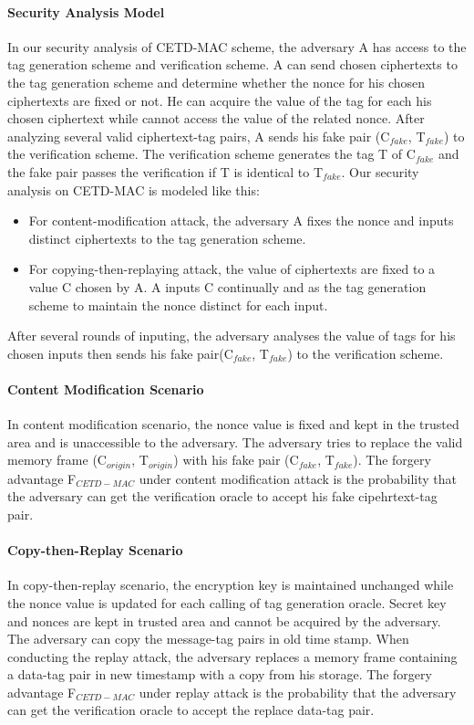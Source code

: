 \documentclass{article}
\begin{document}
\paragraph{Security Analysis Model}%
In our security analysis of CETD-MAC scheme, the adversary A has access to the tag generation scheme and verification scheme. A can send chosen ciphertexts to the tag generation scheme and determine whether the nonce for his chosen ciphertexts are fixed or not. He can acquire the value of the tag for each his chosen ciphertext while cannot access the value of the related nonce. After analyzing several valid ciphertext-tag pairs, A sends his fake pair (C$_{fake}$, T$_{fake}$) to the verification scheme. The verification scheme generates the tag T of C$_{fake}$ and the fake pair passes the verification if T is identical to T$_{fake}$. Our security analysis on CETD-MAC is modeled like this:
\begin{itemize}
	\item For content-modification attack, the adversary A fixes the nonce and inputs distinct ciphertexts to the tag generation scheme. 	
	\item For copying-then-replaying attack, the value of ciphertexts are fixed to a value C chosen by A. A inputs C continually and as the tag generation scheme to maintain the nonce distinct for each input.    
\end{itemize}
After several rounds of inputing, the adversary analyses the value of tags for his chosen inputs then sends his fake pair(C$_{fake}$, T$_{fake}$) to the verification scheme.   	

\paragraph{Content Modification Scenario}
In content modification scenario, the nonce value is fixed and kept in the trusted area and is unaccessible to the adversary. The adversary tries to replace the valid memory frame (C$_{origin}$, T$_{origin}$) with his fake pair (C$_{fake}$, T$_{fake}$). The forgery advantage F$_{CETD-MAC}$ under content modification attack is the probability that the adversary can get the verification oracle to accept his fake cipehrtext-tag pair. 
\paragraph{Copy-then-Replay Scenario}
In copy-then-replay scenario, the encryption key is maintained unchanged while the nonce value is updated for each calling of tag generation oracle. Secret key and nonces are kept in trusted area and cannot be acquired by the adversary. The adversary can copy the message-tag pairs in old time stamp. When conducting the replay attack, the adversary replaces a memory frame containing a data-tag pair in new timestamp with a copy from his storage. The forgery advantage F$_{CETD-MAC}$ under replay attack is the probability that the adversary can get the verification oracle to accept the replace data-tag pair.  
\end{document}
